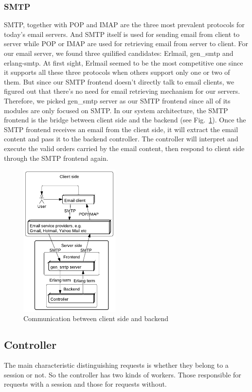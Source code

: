 \documentclass[11pt,a4paper]{report}
\begin{document}
\subsubsection{SMTP}
SMTP, together with POP and IMAP are the three most prevalent protocols for today's email servers.
And SMTP itself is used for sending email from client to server while POP or IMAP
are used for retrieving email from server to client.
For our email server, we found three quilified candidates: Erlmail, gen\_smtp and erlang-smtp.
At first sight, Erlmail seemed to be the most competitive one since it supports all these three
protocols when others support only one or two of them.
But since our SMTP frontend doesn't directly talk to email clients, we figured out
that there's no need for email retrieving mechanism for our servers. Therefore,
we picked gen\_smtp server as our SMTP frontend since all of its modules are only focused
on SMTP. In our system architecture, the SMTP frontend is the bridge between client side and the backend
(see Fig.~\ref{fig:smtp_arch}).
Once the SMTP frontend receives an email from the client side, it will extract the
email content and pass it to the backend controller. The controller will interpret and execute
the valid orders carried by the email content, then respond to client side through the SMTP frontend again.

\begin{figure}[h]
 \centering
 \includegraphics[width=5cm]{./graphics/smtp_arch.pdf}
 \caption{Communication between client side and backend}
 \label{fig:smtp_arch}
\end{figure}

\subsection{Controller}
The main characteristic distinguishing requests is whether they belong to a session or not.
So the controller has two kinds of workers.
Those responsible for requests with a session and those for requests without.
\end{document}
